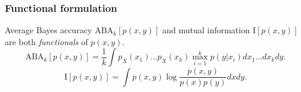 \documentclass{beamer}
\newcommand{\E}{\textbf{E}}
\begin{document}


\begin{frame}
\frametitle{Functional formulation}
Average Bayes accuracy $\text{ABA}_k[p(x, y)]$ and mutual information $\text{I}[p(x, y)]$ are both \emph{functionals} of $p(x, y)$.
\[
\text{ABA}_k[p(x, y)] = \frac{1}{k} \int p_X(x_1)\hdots p_X(x_k) \max_{i=1}^k p(y|x_i)  dx_1\hdots dx_k dy.
\]
\[
\text{I}[p(x, y)] = \int p(x, y) \log \frac{p(x, y)}{p(x)p(y)} dx dy.
\]
\end{frame}

\end{document}
